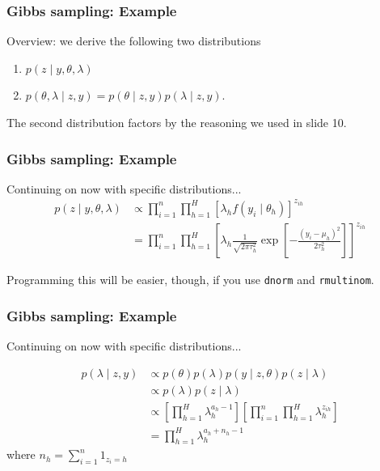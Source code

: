 \documentclass{beamer}
\begin{document}
\begin{frame}
\frametitle{Gibbs sampling: Example}

Overview: we derive the following two distributions
\begin{enumerate}
\item $p(z \mid y, \theta, \lambda) $
\item $p(\theta, \lambda \mid z, y) = p(\theta \mid z, y)p(\lambda \mid z, y)$.
\end{enumerate}
The second distribution factors by the reasoning we used in slide 10.


\end{frame}
\begin{frame}[fragile]
\frametitle{Gibbs sampling: Example}

Continuing on now with specific distributions...
\begin{align*}
p(z \mid y, \theta, \lambda) &\propto \prod_{i=1}^n \prod_{h=1}^H \left[ \lambda_h f(y_i \mid \theta_h)\right]^{z_{ih} } \\
&= \prod_{i=1}^n \prod_{h=1}^H \left[ \lambda_h \frac{1}{\sqrt{2\pi \tau^2_{h} }}\exp\left[-\frac{(y_i - \mu_{h} )^2 }{ 2\tau^2_{h} } \right] \right]^{z_{ih} }
\end{align*}

Programming this will be easier, though, if you use \verb|dnorm| and \verb|rmultinom|.

\end{frame}
\begin{frame}[fragile]
\frametitle{Gibbs sampling: Example}

Continuing on now with specific distributions...
\newline

\begin{align*}
p(\lambda \mid z, y) &\propto p(\theta)p(\lambda )p(y \mid z, \theta)p(z \mid \lambda) \\
&\propto p(\lambda )p(z \mid \lambda) \\
&\propto \left[\prod_{h=1}^H   \lambda_h^{a_h-1}\right] \left[\prod_{i=1}^n  \prod_{h=1}^H \lambda_h^{z_{ih}} \right] \\
&= \prod_{h=1}^H \lambda_h^{a_h + n_h -1}
\end{align*}
where $n_h = \sum_{i=1}^n 1_{z_{i} = h }$


\end{frame}
\end{document}
